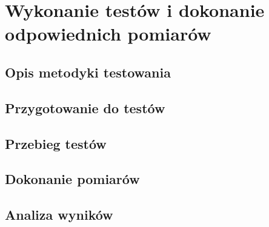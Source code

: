 \chapter{Wykonanie testów i dokonanie odpowiednich pomiarów}
\section{Opis metodyki testowania}
\section{Przygotowanie do testów}
\section{Przebieg testów}
\section{Dokonanie pomiarów}
\section{Analiza wyników}